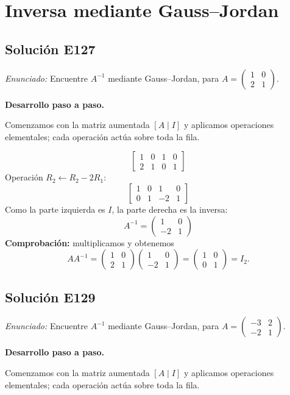 \documentclass[12pt]{article}
\theoremstyle{remark}
\newcommand{\solucion}[2]{\Needspace{11\baselineskip}\subsection*{Solución E#1}\noindent\textit{Enunciado:} #2\par\medskip\noindent\textbf{Desarrollo paso a paso.}\par\medskip}
\begin{document}
\medskip

\section{Inversa mediante Gauss--Jordan}

\solucion{127}{Encuentre $A^{-1}$ mediante Gauss--Jordan, para $A=\begin{pmatrix}1&0\\2&1\end{pmatrix}$.}
Comenzamos con la matriz aumentada $[A\mid I]$ y aplicamos operaciones elementales; cada operación actúa sobre toda la fila.

\[
\left[\begin{array}{rr|rr}1&0&1&0\\2&1&0&1\end{array}\right]
\]
Operación $R_{2}\leftarrow R_{2}-2R_{1}$:
\[
\left[\begin{array}{rr|rr}1&0&1&0\\0&1&-2&1\end{array}\right]
\]
Como la parte izquierda es $I$, la parte derecha es la inversa:
\[
\boxed{A^{-1}=\begin{pmatrix}1&0\\-2&1\end{pmatrix}}
\]
\textbf{Comprobación:} multiplicamos y obtenemos
\[
AA^{-1}=\begin{pmatrix}1&0\\2&1\end{pmatrix}\begin{pmatrix}1&0\\-2&1\end{pmatrix}=\begin{pmatrix}1&0\\0&1\end{pmatrix}=I_{2}.
\]

\medskip

\solucion{129}{Encuentre $A^{-1}$ mediante Gauss--Jordan, para $A=\begin{pmatrix}-3&2\\-2&1\end{pmatrix}$.}
Comenzamos con la matriz aumentada $[A\mid I]$ y aplicamos operaciones elementales; cada operación actúa sobre toda la fila.
\end{document}
